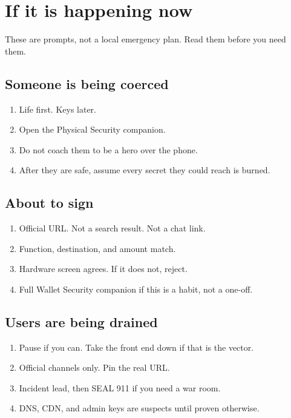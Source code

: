 \chapter{If it is happening now}

These are prompts, not a local emergency plan. Read them
before you need them.

\section{Someone is being coerced}

\begin{enumerate}
  \item Life first. Keys later.
  \item Open the Physical Security companion.
  \item Do not coach them to be a hero over the phone.
  \item After they are safe, assume every secret they
  could reach is burned.
\end{enumerate}

\section{About to sign}

\begin{enumerate}
  \item Official URL. Not a search result. Not a chat
  link.
  \item Function, destination, and amount match.
  \item Hardware screen agrees. If it does not, reject.
  \item Full Wallet Security companion if this is a
  habit, not a one-off.
\end{enumerate}

\section{Users are being drained}

\begin{enumerate}
  \item Pause if you can. Take the front end down if
  that is the vector.
  \item Official channels only. Pin the real URL.
  \item Incident lead, then SEAL 911 if you need a war
  room.
  \item DNS, CDN, and admin keys are suspects until
  proven otherwise.
\end{enumerate}

